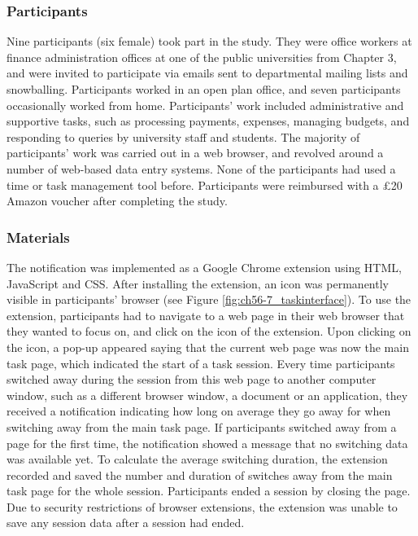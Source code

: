 \subsubsection{Participants}
Nine participants (six female) took part in the study. They were office workers at finance administration offices at one of the public universities from Chapter 3, and were invited to participate via emails sent to departmental mailing lists and snowballing. Participants worked in an open plan office, and seven participants occasionally worked from home. Participants’ work included administrative and supportive tasks, such as processing payments, expenses, managing budgets, and responding to queries by university staff and students. The majority of participants’ work was carried out in a web browser, and revolved around a number of web-based data entry systems. None of the participants had used a time or task management tool before. Participants were reimbursed with a  \pounds 20 Amazon voucher after completing the study. 


\subsubsection{Materials}
The notification was implemented as a Google Chrome extension using HTML, JavaScript and CSS. After installing the extension, an icon was permanently visible in participants’ browser (see Figure \ref{fig:ch56-7_taskinterface}). To use the extension, participants had to navigate to a web page in their web browser that they wanted to focus on, and click on the icon of the extension. Upon clicking on the icon, a pop-up appeared saying that the current web page was now the main task page, which indicated the start of a task session. Every time participants switched away during the session from this web page to another computer window, such as a different browser window, a document or an application, they received a notification indicating how long on average they go away for when switching away from the main task page. If participants switched away from a page for the first time, the notification showed a message that no switching data was available yet. To calculate the average switching duration, the extension recorded and saved the number and duration of switches away from the main task page for the whole session. Participants ended a session by closing the page. Due to security restrictions of browser extensions, the extension was unable to save any session data after a session had ended. 

